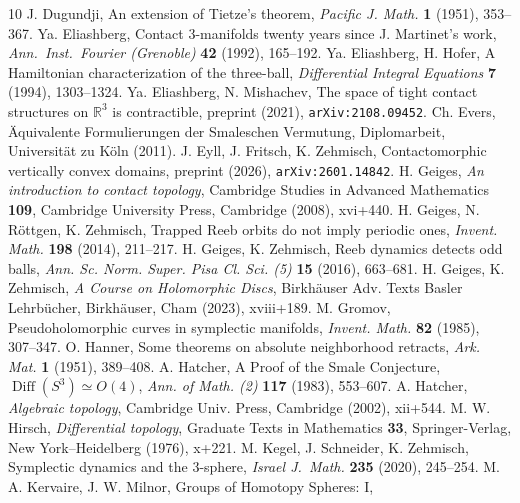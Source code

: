 \documentclass{amsart}
\theoremstyle{definition}
\begin{document}
\begin{thebibliography}{10}
{\sc J. Dugundji},
An extension of Tietze's theorem,
\textit{Pacific J. Math.} {\bf 1} (1951),
353--367.
%
{\sc Ya. Eliashberg},
Contact 3-manifolds twenty years since J. Martinet's work,
\textit{Ann.\ Inst.\ Fourier (Grenoble)} {\bf 42} (1992),
165--192.
%
  {\sc Ya. Eliashberg, H. Hofer},
  A Hamiltonian characterization of the three-ball,
  \textit{Differential Integral Equations} {\bf 7} (1994),
  1303--1324.
%
  {\sc Ya. Eliashberg, N. Mishachev},
  The space of tight contact structures on ${\mathbb R}^3$ is
  contractible,
  preprint (2021),
  {\tt arXiv:2108.09452}.
%
  {\sc Ch. Evers},
  {\"A}quivalente Formulierungen der Smaleschen Vermutung,
  Diplomarbeit, Universit\"at zu K\"oln (2011).
%  
  {\sc J. Eyll, J. Fritsch, K. Zehmisch},
  Contactomorphic vertically convex domains,
  preprint (2026), {\tt arXiv:2601.14842}.
%
  {\sc H. Geiges},
  \textit{An introduction to contact topology},
  Cambridge Studies in Advanced Mathematics {\bf 109},
  Cambridge University Press, Cambridge (2008),
  xvi+440.
%
 {\sc H. Geiges, N. R\"ottgen, K. Zehmisch},
 Trapped {R}eeb orbits do not imply periodic ones,
 \textit{Invent. Math.} {\bf 198} (2014),
 211--217.
%
  {\sc H. Geiges, K. Zehmisch},
  Reeb dynamics detects odd balls,
  \textit{Ann. Sc. Norm. Super. Pisa Cl. Sci. (5)} {\bf 15} (2016),
  663--681.
%
  {\sc H. Geiges, K. Zehmisch},
  \textit{A Course on Holomorphic Discs},
  Birkh\"auser Adv. Texts Basler Lehrb\"ucher,
  Birkh\"auser, Cham (2023),
  xviii+189.
%  
  {\sc M. Gromov},
  Pseudoholomorphic curves in symplectic manifolds,
  \textit{Invent. Math.} {\bf 82} (1985),
  307--347.
%
  {\sc O. Hanner},
  Some theorems on absolute neighborhood retracts,
  \textit{Ark. Mat.} {\bf 1} (1951),
  389--408.
% 
  {\sc A. Hatcher},
  A Proof of the {Smale} Conjecture,
  $\operatorname{Diff}(S^3) \simeq O(4)$,
  \textit{Ann. of Math. (2)} {\bf 117} (1983),
  553--607.
%
  {\sc A. Hatcher},
  \emph{Algebraic topology},
  Cambridge Univ. Press, Cambridge (2002),
  xii+544.
%
  {\sc M. W. Hirsch},
  \textit{Differential topology},
  Graduate Texts in Mathematics {\bf 33},
  Springer-Verlag, New York--Heidelberg (1976),
  x+221.
%
  {\sc M. Kegel, J. Schneider, K. Zehmisch},
  Symplectic dynamics and the 3-sphere,
  \textit{Israel J.\ Math.} {\bf 235} (2020),
  245--254.
%
  {\sc M. A. Kervaire, J. W. Milnor},
  Groups of Homotopy Spheres: {I},

\end{thebibliography}
\end{document}
